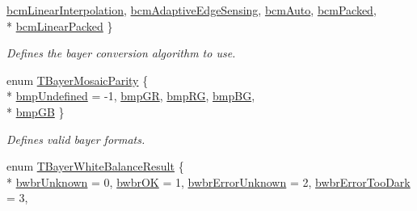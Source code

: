 \begin{DoxyCompactItemize}
\hyperlink{group___common_interface_ggab19b45fcaaa584be84a99a3d7098b055a63ea2b0afc88951809e9aa120bc93eba}{bcm\+Linear\+Interpolation}, 
\hyperlink{group___common_interface_ggab19b45fcaaa584be84a99a3d7098b055a229781c452750addaa92ee6106c1c629}{bcm\+Adaptive\+Edge\+Sensing}, 
\hyperlink{group___common_interface_ggab19b45fcaaa584be84a99a3d7098b055ad6a56f2b00e655567450658a86988d5d}{bcm\+Auto}, 
\hyperlink{group___common_interface_ggab19b45fcaaa584be84a99a3d7098b055a40ef8442525e2816e98b5ad33eac4923}{bcm\+Packed}, 
\\*
\hyperlink{group___common_interface_ggab19b45fcaaa584be84a99a3d7098b055aeb581c81c7da5d972d56d6c164a19469}{bcm\+Linear\+Packed}
 \}
\begin{DoxyCompactList}\small\item\em Defines the bayer conversion algorithm to use. \end{DoxyCompactList}\item 
enum \hyperlink{group___common_interface_ga9e2a1b46f3ed21b46b867c6d88d25598}{T\+Bayer\+Mosaic\+Parity} \{ \\*
\hyperlink{group___common_interface_gga9e2a1b46f3ed21b46b867c6d88d25598a7e2f0c980d2f6e5260afe5d902176938}{bmp\+Undefined} = -\/1, 
\hyperlink{group___common_interface_gga9e2a1b46f3ed21b46b867c6d88d25598aabd1389fedac9b9ffaf233c1c8d45e55}{bmp\+G\+R}, 
\hyperlink{group___common_interface_gga9e2a1b46f3ed21b46b867c6d88d25598a83dccb276f153cfb193dac985c2b681c}{bmp\+R\+G}, 
\hyperlink{group___common_interface_gga9e2a1b46f3ed21b46b867c6d88d25598a29b6e472c9405a75fbcc7f2a58a630d6}{bmp\+B\+G}, 
\\*
\hyperlink{group___common_interface_gga9e2a1b46f3ed21b46b867c6d88d25598ab048eef5caf903c810e2de3ba6dc91ef}{bmp\+G\+B}
 \}
\begin{DoxyCompactList}\small\item\em Defines valid bayer formats. \end{DoxyCompactList}\item 
enum \hyperlink{group___common_interface_gac25746f6cbcf893d3ca308d3e978f39d}{T\+Bayer\+White\+Balance\+Result} \{ \\*
\hyperlink{group___common_interface_ggac25746f6cbcf893d3ca308d3e978f39dacf97bbf381766820438e2ad5d47812b9}{bwbr\+Unknown} = 0, 
\hyperlink{group___common_interface_ggac25746f6cbcf893d3ca308d3e978f39daf8bfe1f907251dcabe7383de7f203abc}{bwbr\+O\+K} = 1, 
\hyperlink{group___common_interface_ggac25746f6cbcf893d3ca308d3e978f39dabf3dac6ebff13bcc06d3956393786cb6}{bwbr\+Error\+Unknown} = 2, 
\hyperlink{group___common_interface_ggac25746f6cbcf893d3ca308d3e978f39dad9346833bbcab449964e8c0c92132175}{bwbr\+Error\+Too\+Dark} = 3, 

\end{DoxyCompactItemize}
